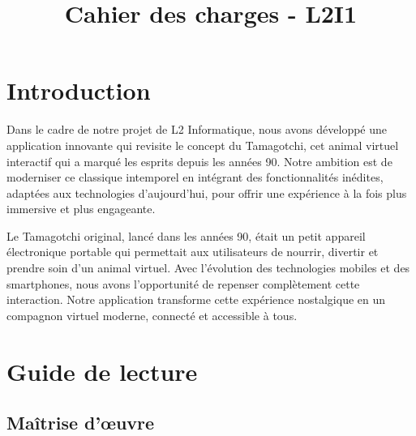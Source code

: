 \documentclass{rapportECL}
\title{Cahier des charges - L2I1} %
\begin{document}




        
\fairemarges %
\fairepagedegarde %
\renewcommand{\contentsname}{Sommaire}
\tableofcontents %
\newpage




\section{Introduction} 

Dans le cadre de notre projet de L2 Informatique, nous avons développé une application innovante qui revisite le concept du Tamagotchi, cet animal virtuel interactif qui a marqué les esprits depuis les années 90. Notre ambition est de moderniser ce classique intemporel en intégrant des fonctionnalités inédites, adaptées aux technologies d’aujourd’hui, pour offrir une expérience à la fois plus immersive et plus engageante.

Le Tamagotchi original, lancé dans les années 90, était un petit appareil électronique portable qui permettait aux utilisateurs de nourrir, divertir et prendre soin d’un animal virtuel. Avec l’évolution des technologies mobiles et des smartphones, nous avons l’opportunité de repenser complètement cette interaction. Notre application transforme cette expérience nostalgique en un compagnon virtuel moderne, connecté et accessible à tous.


\section{Guide de lecture}

\subsection{Maîtrise d’œuvre}
\end{document}
